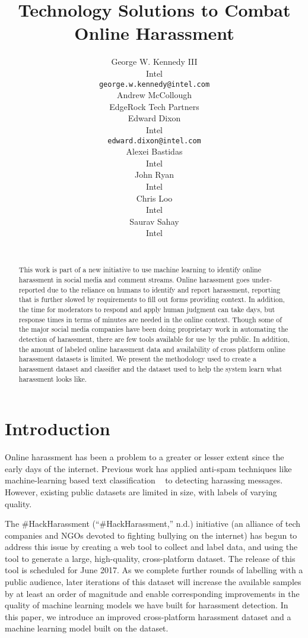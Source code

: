 \documentclass[11pt,a4paper]{article}
\title{Technology Solutions to Combat Online Harassment}
\author{George W. Kennedy III \\
  Intel \\
  {\tt george.w.kennedy@intel.com} \\
  \And
  Andrew McCollough \\
  EdgeRock Tech Partners \\
  \And
  Edward Dixon \\
  Intel\\
 {\tt edward.dixon@intel.com} \\
  \And
  Alexei Bastidas \\
  Intel \\
  \And
  John Ryan \\
  Intel \\
  \And
  Chris Loo \\
  Intel \\
  \And
  Saurav Sahay \\
  Intel \\\
}
\date{}
\begin{document}
\maketitle
\begin{abstract}
  This work is part of a new initiative to use machine
  learning to identify online harassment in social media
  and comment streams. Online harassment goes
  under-reported due to the reliance on humans to
  identify and report harassment, reporting that is further
  slowed by requirements to fill out forms
  providing context. In addition, the time for moderators
  to respond and apply human judgment can
  take days, but response times in terms of minutes
  are needed in the online context. Though some of
  the major social media companies have been doing
  proprietary work in automating the detection of
  harassment, there are few tools available for use by
  the public. In addition, the amount of labeled online
  harassment data and availability of cross platform
  online harassment datasets is limited. We present
  the methodology used to create a harassment dataset
  and classifier and the dataset used to help the
  system learn what harassment looks like.

\end{abstract}

\section{Introduction}

Online harassment has been a problem to a greater
or lesser extent since the early days of the internet.
Previous work has applied anti-spam techniques
like machine-learning based text classification ~\cite{Reynolds:2011} to
detecting harassing messages. However, existing
public datasets are limited in size, with labels of
varying quality.

The \#HackHarassment (“\#HackHarassment,”
n.d.) initiative (an alliance of tech companies and
NGOs devoted to fighting bullying on the internet)
has begun to address this issue by creating a web
tool to collect and label data, and using the tool to
generate a large, high-quality, cross-platform dataset.
The release of this tool is scheduled for June
2017. As we complete further rounds of labelling
with a public audience, later iterations of this dataset
will increase the available samples by at least
an order of magnitude and enable corresponding
improvements in the quality of machine learning
models we have built for harassment detection. In
this paper, we introduce an improved cross-platform
harassment dataset and a machine learning
model built on the dataset.
\end{document}
